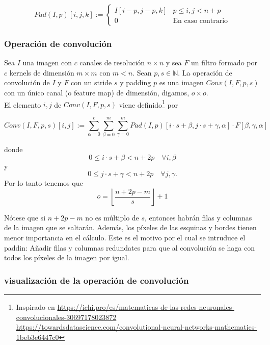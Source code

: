 \documentclass{article}
\begin{document}
$$Pad(I,p)[i,j,k]:=\begin{cases}
  I[i-p,j-p,k] & p\leq i,j<n+p\\
  0 & \text{En caso contrario}
\end{cases} $$


\subsubsection{Operación de convolución}
Sea $I$ una imagen con $c$ canales de resolución $n\times n$ y sea $F$ un filtro formado por $c$ kernels de dimensión $m\times m$ con $m<n$. Sean $p,s\in \mathbb{N}$. La operación de convolución de $I$ y $F$ con un stride $s$ y padding $p$ es una imagen $Conv(I,F,p,s)$ con un único canal (o feature map) de dimensión, digamos, $o\times o$.\\


El elemento $i,j$ de $Conv(I,F,p,s)$ viene definido\footnote{Inspirado en \url{https://ichi.pro/es/matematicas-de-las-redes-neuronales-convolucionales-30697178023872}  \url{https://towardsdatascience.com/convolutional-neural-networks-mathematics-1beb3e6447c0}} por


$$Conv(I,F,p,s)[i,j]:=\sum_{\alpha=0}^c \sum_{\beta=0}^m \sum_{\gamma=0}^m Pad(I,p)[i\cdot s+\beta,j\cdot s+\gamma,\alpha]\cdot  F[\beta,\gamma,\alpha]$$

donde 
$$0\leq i\cdot s+\beta <n+2p \quad \forall i,\beta $$
y
$$0\leq j\cdot s+\gamma <n+2p \quad \forall j,\gamma .$$
Por lo tanto tenemos que  
$$o=\left\lfloor \frac{n+2p-m}{s}\right\rfloor+1$$

Nótese que si $n+2p-m$ no es múltiplo de $s$, entonces habrán filas y columnas de la imagen que se saltarán. Además, los píxeles de las esquinas y bordes tienen menor importancia en el cálculo. Este es el motivo por el cual se intruduce el paddin: Añadir filas y columnas redundates para que al convolución se haga con todos los píxeles de la imagen por igual.

\subsubsection{visualización de la operación de convolución}
\end{document}

